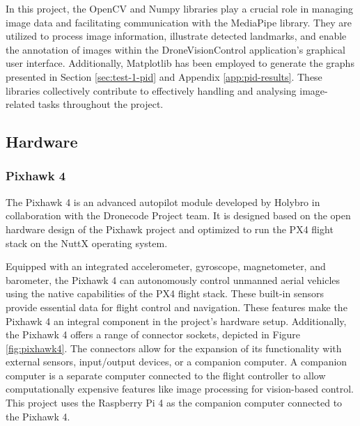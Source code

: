 In this project, the OpenCV and Numpy libraries play a crucial role in managing image data and facilitating communication with the MediaPipe library. They are utilized to process image information, illustrate detected landmarks, and enable the annotation of images within the DroneVisionControl application's graphical user interface. Additionally, Matplotlib has been employed to generate the graphs presented in Section \ref{sec:test-1-pid} and Appendix \ref{app:pid-results}. These libraries collectively contribute to effectively handling and analysing image-related tasks throughout the project.

\subsection{Hardware}
\subsubsection{Pixhawk 4}
\label{subsec:pixhawk}

The Pixhawk 4 is an advanced autopilot module developed by Holybro \cite{holybro-front} in collaboration with the Dronecode Project team. It is designed based on the open hardware design of the Pixhawk project \cite{pixhawk-front} and optimized to run the PX4 flight stack on the NuttX \cite{nuttx-front} operating system.

Equipped with an integrated accelerometer, gyroscope, magnetometer, and barometer, the Pixhawk 4 can autonomously control unmanned aerial vehicles using the native capabilities of the PX4 flight stack. These built-in sensors provide essential data for flight control and navigation.
These features make the Pixhawk 4 an integral component in the project's hardware setup.
Additionally, the Pixhawk 4 offers a range of connector sockets, depicted in Figure \ref{fig:pixhawk4}. The connectors allow for the expansion of its functionality with external sensors, input/output devices, or a companion computer. A companion computer is a separate computer connected to the flight controller to allow computationally expensive features like image processing for vision-based control. This project uses the Raspberry Pi 4 as the companion computer connected to the Pixhawk 4.


